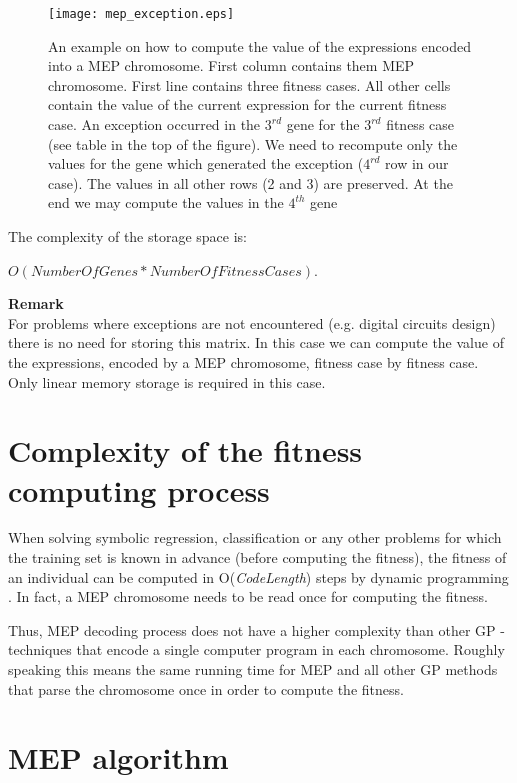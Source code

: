 \documentclass [11pt]{article}
\begin{document}
\begin{figure}[htbp]
\centerline{\texttt{[image: mep\_exception.eps]}}
\label{mep_exceptions_fig}
\caption{An example on how to compute the value of the expressions encoded into a MEP chromosome. First column contains them MEP chromosome. First line contains three fitness cases. All other cells contain the value of the current expression for the current fitness case. An exception occurred in the $3^{rd}$ gene for the $3^{rd}$ fitness case (see table in the top of the figure). We need to recompute only the values for the gene which generated the exception ($4^{rd}$ row in our case). The values in all other rows (2 and 3) are preserved. At the end we may compute the values in the $4^{th}$ gene}
\end{figure}


The complexity of the storage space is:

\begin{center}
$O(NumberOfGenes * NumberOfFitnessCases)$.
\end{center}


\textbf{Remark}\\

For problems where exceptions are not encountered (e.g. digital circuits design) there is no need for storing this matrix. In this case we can compute the value of the expressions, encoded by a MEP chromosome, fitness case by fitness case. Only linear memory storage is required in this case.

\section{Complexity of the fitness computing process}
\label{MEP_complexity}

When solving symbolic regression, classification or any other problems for 
which the training set is known in advance (before computing the fitness), 
the fitness of an individual can be computed in O(\textit{CodeLength}) steps by dynamic 
programming \cite{bellman1}. In fact, a MEP chromosome needs to be read once for 
computing the fitness. 

Thus, MEP decoding process does not have a higher complexity than other GP - 
techniques that encode a single computer program in each chromosome. Roughly speaking this means the same running time for MEP and all other GP methods that parse the chromosome once in order to compute the fitness.

\section{MEP algorithm}
\label{MEP_algorithm}
\end{document}
